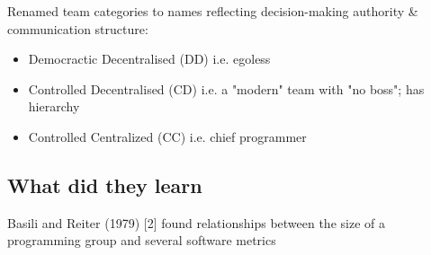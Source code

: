 Renamed team categories to names reflecting decision-making authority \& communication structure:

\begin{itemize}
    \item Democractic Decentralised (DD) i.e. egoless
    \item Controlled Decentralised (CD) i.e. a "modern" team with "no boss"; has hierarchy
    \item Controlled Centralized (CC) i.e. chief programmer
\end{itemize}

\subsection{What did they learn}

Basili and Reiter (1979) [2] found relationships between the size of a programming group and several software metrics
